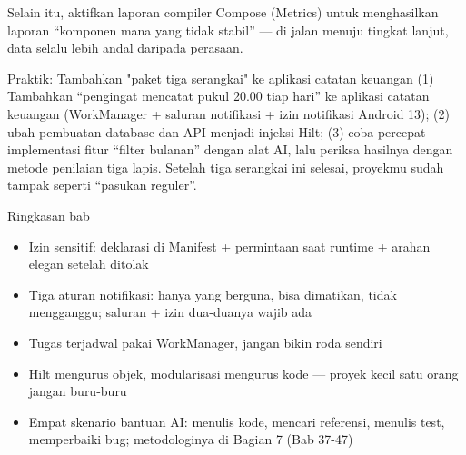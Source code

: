 Selain itu, aktifkan laporan compiler Compose (Metrics) untuk menghasilkan laporan “komponen mana yang tidak stabil” — di jalan menuju tingkat lanjut, data selalu lebih andal daripada perasaan.

\begin{tcbpractice}{Praktik: Tambahkan "paket tiga serangkai" ke aplikasi catatan keuangan}
(1) Tambahkan “pengingat mencatat pukul 20.00 tiap hari” ke aplikasi catatan keuangan (WorkManager + saluran notifikasi + izin notifikasi Android 13); (2) ubah pembuatan database dan API menjadi injeksi Hilt; (3) coba percepat implementasi fitur “filter bulanan” dengan alat AI, lalu periksa hasilnya dengan metode penilaian tiga lapis. Setelah tiga serangkai ini selesai, proyekmu sudah tampak seperti “pasukan reguler”.

\end{tcbpractice}

\begin{tcbsummary}{Ringkasan bab}
\begin{itemize}
  \item Izin sensitif: deklarasi di Manifest + permintaan saat runtime + arahan elegan setelah ditolak
  \item Tiga aturan notifikasi: hanya yang berguna, bisa dimatikan, tidak mengganggu; saluran + izin dua-duanya wajib ada
  \item Tugas terjadwal pakai WorkManager, jangan bikin roda sendiri
  \item Hilt mengurus objek, modularisasi mengurus kode — proyek kecil satu orang jangan buru-buru
  \item Empat skenario bantuan AI: menulis kode, mencari referensi, menulis test, memperbaiki bug; metodologinya di Bagian 7 (Bab 37-47)
\end{itemize}

\end{tcbsummary}
